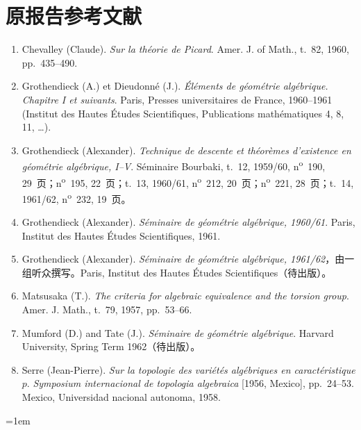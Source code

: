\section*{原报告参考文献}
\begin{enumerate}
\item[{[1]}]\label{fga3.vi-bib-1} Chevalley (Claude). \emph{Sur la théorie de Picard}. Amer. J. of Math., t.~82, 1960, pp.~435--490.
\item[{[2]}]\label{fga3.vi-bib-2} Grothendieck (A.) et Dieudonné (J.). \emph{Éléments de géométrie algébrique. Chapitre I et suivants}. Paris, Presses universitaires de France, 1960--1961 (Institut des Hautes Études Scientifiques, Publications mathématiques 4, 8, 11, \ldots).
\item[{[3]}]\label{fga3.vi-bib-3} Grothendieck (Alexander). \emph{Technique de descente et théorèmes d'existence en géométrie algébrique, I--V}. Séminaire Bourbaki, t.~12, 1959/60, n\textsuperscript{o}~190, 29~页；n\textsuperscript{o}~195, 22~页；t.~13, 1960/61, n\textsuperscript{o}~212, 20~页；n\textsuperscript{o}~221, 28~页；t.~14, 1961/62, n\textsuperscript{o}~232, 19~页。
\item[{[4]}]\label{fga3.vi-bib-4} Grothendieck (Alexander). \emph{Séminaire de géométrie algébrique, 1960/61}. Paris, Institut des Hautes Études Scientifiques, 1961.
\item[{[5]}]\label{fga3.vi-bib-5} Grothendieck (Alexander). \emph{Séminaire de géométrie algébrique, 1961/62}，由一组听众撰写。Paris, Institut des Hautes Études Scientifiques（待出版）。
\item[{[6]}]\label{fga3.vi-bib-6} Matsusaka (T.). \emph{The criteria for algebraic equivalence and the torsion group}. Amer. J. Math., t.~79, 1957, pp.~53--66.
\item[{[7]}]\label{fga3.vi-bib-7} Mumford (D.) and Tate (J.). \emph{Séminaire de géométrie algébrique}. Harvard University, Spring Term 1962（待出版）。
\item[{[8]}]\label{fga3.vi-bib-8} Serre (Jean-Pierre). \emph{Sur la topologie des variétés algébriques en caractéristique $p$}. \emph{Symposium internacional de topologia algebraica} [1956, Mexico], pp.~24--53. Mexico, Universidad nacional autonoma, 1958.
\end{enumerate}


\backmatter
\pagestyle{plain}
\nocite{*}
\begingroup
\emergencystretch=1em
\printbibliography[heading=bibintoc,title=参考文献]
\endgroup

